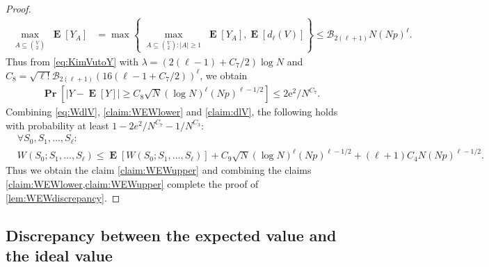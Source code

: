 \documentclass[letterpaper,11pt]{article}
\newcommand{\Vsize}{N}
\newcommand{\pmax}{p}
\renewcommand\Pr{\mathop{\mathbf{Pr}}}
\DeclareMathOperator{\E}{\mathbf{E}}
\begin{document}
\begin{proof}
\begin{align*}
\max_{\substack{A\subseteq \binom{V}{2}}}\E[Y_{A}]
&=\max\left\{ \max_{\substack{A\subseteq \binom{V}{2}:|A|\geq 1}}\E[Y_{A}], \E[d_\ell(V)] \right\}
\leq \mathcal{B}_{2(\ell+1)}\Vsize(\Vsize\pmax)^{\ell}.
\end{align*}
Thus from \cref{eq:KimVutoY}  
with $\lambda=(2(\ell-1)+C_7/2)\log \Vsize$ and $C_8=\sqrt{\ell!} \mathcal{B}_{2(\ell+1)} (16(\ell-1+C_7/2))^\ell$, 
we obtain
\begin{align}
\Pr\left[|Y-\E[Y]|\geq C_8\sqrt{\Vsize }(\log \Vsize)^\ell (\Vsize \pmax)^{\ell-1/2}\right]\leq 2\mathrm{e}^2/\Vsize^{C_7}.
\label{claim:dlV}
\end{align}
Combining \cref{eq:WdlV}, \cref{claim:WEWlower} and \cref{claim:dlV}, the following holds with probability at least $1-2e^2/\Vsize^{C_7}-1/\Vsize^{C_3}$:
\begin{align*}
&\forall S_0, S_1, \ldots, S_\ell: \\
&W(S_0;S_1,\ldots,S_{\ell})
\leq
\E[W(S_0;S_1,\ldots,S_{\ell})]+C_9\sqrt{\Vsize }(\log \Vsize)^\ell (\Vsize \pmax)^{\ell-1/2}+(\ell+1)C_4 \Vsize (\Vsize\pmax)^{\ell-1/2}.
\end{align*}
Thus we obtain the claim \cref{claim:WEWupper} and combining the claims \cref{claim:WEWlower,claim:WEWupper} complete the proof of \cref{lem:WEWdiscrepancy}.
\end{proof}
\subsection{Discrepancy between the expected value and the ideal value}
\label{sec:EW-Wh}
\end{document}
